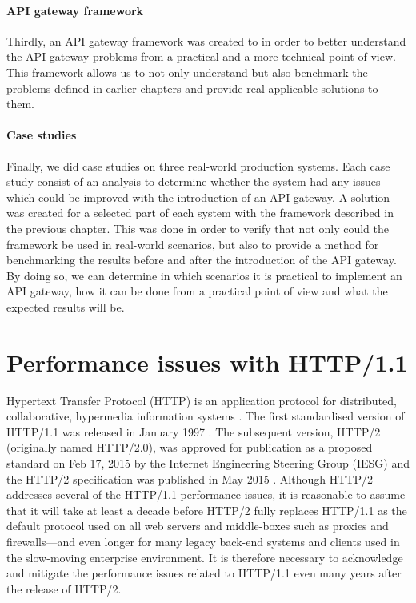 \documentclass{cslthse-msc}
\begin{document}
\subsubsection{API gateway framework}
Thirdly, an API gateway framework was created to in order to better understand the API gateway problems from a practical and a more technical point of view. This framework allows us to not only understand but also benchmark the problems defined in earlier chapters and provide real applicable solutions to them.

\subsubsection{Case studies}
Finally, we did case studies on three real-world production systems. Each case study consist of an analysis to determine whether the system had any issues which could be improved with the introduction of an API gateway. A solution was created for a selected part of each system with the framework described in the previous chapter. This was done in order to verify that not only could the framework be used in real-world scenarios, but also to provide a method for benchmarking the results before and after the introduction of the API gateway. By doing so, we can determine in which scenarios it is practical to implement an API gateway, how it can be done from a practical point of view and what the expected results will be.

\chapter{Performance issues with HTTP/1.1}
Hypertext Transfer Protocol (HTTP) is an application protocol for distributed, collaborative, hypermedia information systems \cite{rfc2616}. The first standardised version of HTTP/1.1 was released in January 1997 \cite{rfc2068}. The subsequent version, HTTP/2 (originally named HTTP/2.0), was approved for publication as a proposed standard on Feb 17, 2015 by the Internet Engineering Steering Group (IESG) and the HTTP/2 specification was published in May 2015 \cite{rfc_7540}. Although HTTP/2 addresses several of the HTTP/1.1 performance issues, it is reasonable to assume that it will take at least a decade \cite[page 21]{hpbn2} before HTTP/2 fully replaces HTTP/1.1 as the default protocol used on all web servers and middle-boxes such as proxies and firewalls---and even longer for many legacy back-end systems and clients used in the slow-moving enterprise environment. It is therefore necessary to acknowledge and mitigate the performance issues related to HTTP/1.1 even many years after the release of HTTP/2.
\end{document}
